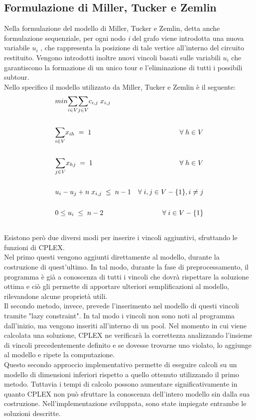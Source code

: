 \subsection{Formulazione di Miller, Tucker e Zemlin}
Nella formulazione del modello di Miller, Tucker e Zemlin, detta anche formulazione sequenziale, per ogni nodo \textit{i} del grafo viene introdotta una nuova variabile $u_i$ , che rappresenta la posizione di tale vertice all'interno del circuito restituito. Vengono introdotti inoltre nuovi vincoli basati sulle variabili $u_i$ che garantiscono la formazione di un unico tour e l'eliminazione di tutti i possibili subtour.\\
Nello specifico il modello utilizzato da Miller, Tucker e Zemlin è il seguente:
\vspace{1cm}
\begin{align}
& min \underset{i\in V}\sum{}\underset{j\in V}\sum{c_{i,j}\; x_{i,j}} \\ \notag \\
& \underset{i\in V}\sum{x_{ih}}\; =\; 1 & \forall\; h\in V \\ \notag \\
& \underset{j\in V}\sum{x_{hj}}\; =\; 1 & \forall\; h\in V \\ \notag \\
& u_i-u_j+n\; x_{i,j}\;\leq\; n-1 & \forall\; i,j\in V-\{ 1\} , i\neq j \\ \notag \\
& 0\leq u_i\;\leq\; n-2 & \forall\; i\in V-\{ 1\} \\ \notag 
\end{align}
Esistono però due diversi modi per inserire i vincoli aggiuntivi, sfruttando le funzioni di CPLEX.\\
Nel primo questi vengono aggiunti direttamente al modello, durante la costruzione di quest'ultimo. In tal modo, durante la fase di preprocessamento, il programma è già a conoscenza di tutti i vincoli che dovrà rispettare la soluzione ottima e ciò gli permette di apportare ulteriori semplificazioni al modello, rilevandone alcune proprietà utili.\\
Il secondo metodo, invece, prevede l'inserimento nel modello di questi vincoli tramite "lazy constraint". In tal modo i vincoli non sono noti al programma dall'inizio, ma vengono inseriti all'interno di un pool. Nel momento in cui viene calcolata una soluzione, CPLEX ne verificarà la correttezza analizzando l'insieme di vincoli precedentemente definito e se dovesse trovarne uno violato, lo aggiunge al modello e ripete la computazione.\\
Questo secondo approccio implementativo permette di eseguire calcoli su un modello di dimensioni inferiori rispetto a quello ottenuto utilizzando il primo metodo. Tuttavia i tempi di calcolo possono aumentare significativamente in quanto CPLEX non può sfruttare la conoscenza dell'intero modello sin dalla sua costruzione. 
Nell'implementazione sviluppata, sono state impiegate entrambe le soluzioni descritte.

